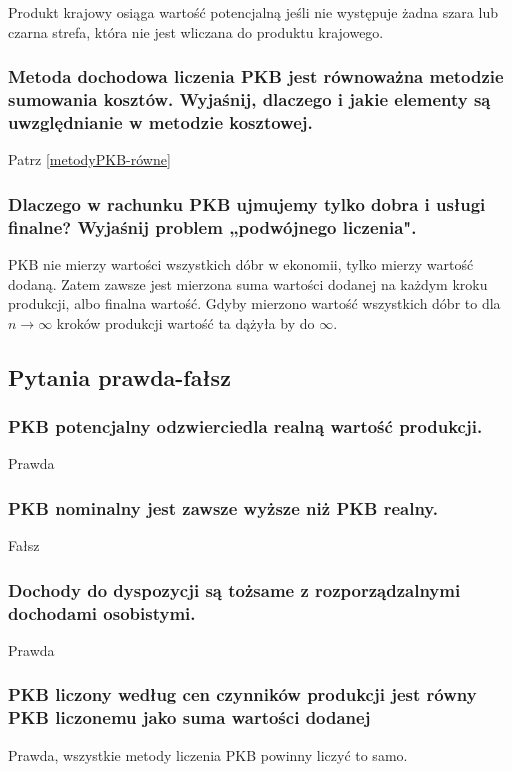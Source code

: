 \documentclass[a4paper,12pt]{article}
\begin{document}
Produkt krajowy osiąga wartość potencjalną jeśli nie występuje żadna szara lub czarna strefa, która nie jest wliczana do produktu krajowego.

\subsubsection{Metoda dochodowa liczenia PKB jest równoważna metodzie sumowania kosztów. Wyjaśnij, dlaczego i jakie elementy są uwzględnianie w metodzie kosztowej.
}
Patrz \ref{metodyPKB-równe}


\subsubsection{Dlaczego w rachunku PKB ujmujemy tylko dobra i usługi finalne? Wyjaśnij problem „podwójnego liczenia".}

PKB nie mierzy wartości wszystkich dóbr w ekonomii, tylko mierzy wartość dodaną. Zatem zawsze jest mierzona suma wartości dodanej na każdym kroku produkcji, albo finalna wartość. Gdyby mierzono wartość wszystkich dóbr to dla $n \rightarrow \infty$ kroków produkcji wartość ta dążyła by do $\infty$.

\subsection{Pytania prawda-fałsz}

\subsubsection{PKB potencjalny odzwierciedla realną wartość produkcji.}

Prawda

\subsubsection{PKB nominalny jest zawsze wyższe niż PKB realny.}

Fałsz

\subsubsection{Dochody do dyspozycji są tożsame z rozporządzalnymi dochodami osobistymi.}
Prawda

\subsubsection{PKB liczony według cen czynników produkcji jest równy PKB liczonemu jako suma wartości dodanej}
Prawda, wszystkie metody liczenia PKB powinny liczyć to samo.
\end{document}
